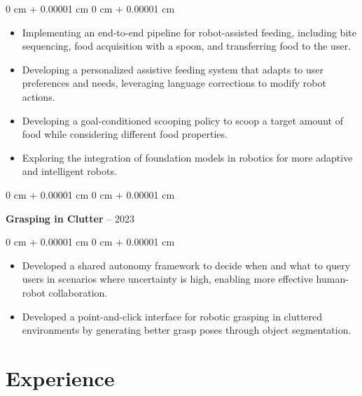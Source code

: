 \documentclass[10pt, letterpaper]{article}
\newenvironment{highlights}{
    \begin{itemize}[
        topsep=0.10 cm,
        parsep=0.10 cm,
        partopsep=0pt,
        itemsep=0pt,
        leftmargin=0 cm + 10pt
    ]
}{
    \end{itemize}
} %
\newenvironment{onecolentry}{
    \begin{adjustwidth}{
        0 cm + 0.00001 cm
    }{
        0 cm + 0.00001 cm
    }
}{
    \end{adjustwidth}
} %
\newenvironment{twocolentry}[2][]{
    \onecolentry
    \def\secondColumn{#2}
    \setcolumnwidth{\fill, 4.5 cm}
    \begin{paracol}{2}
}{
    \switchcolumn \raggedleft \secondColumn
    \end{paracol}
    \endonecolentry
} %
\begin{document}
        \vspace{0.10 cm}
        \begin{onecolentry}
            \begin{highlights}
                \item Implementing an end-to-end pipeline for robot-assisted feeding, including bite sequencing, food acquisition with a spoon, and transferring food to the user.
                \item Developing a personalized assistive feeding system that adapts to user preferences and needs, leveraging language corrections to modify robot actions.
                \item Developing a goal-conditioned scooping policy to scoop a target amount of food while considering different food properties.
                \item Exploring the integration of foundation models in robotics for more adaptive and intelligent robots.
            \end{highlights}
        \end{onecolentry}


        \vspace{0.2 cm}

        \begin{twocolentry}{
            2020 -- 2023
        }
            \textbf{Grasping in Clutter}\end{twocolentry}

        \vspace{0.10 cm}
        \begin{onecolentry}
            \begin{highlights}
                \item Developed a shared autonomy framework to decide when and what to query users in scenarios where uncertainty is high, enabling more effective human-robot collaboration.
                \item Developed a point-and-click interface for robotic grasping in cluttered environments by generating better grasp poses through object segmentation.
            \end{highlights}
        \end{onecolentry}



    
    \section{Experience}
\end{document}
